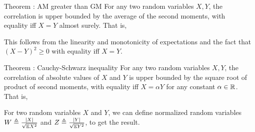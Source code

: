 \documentclass[12pt,aspectratio=169]{beamer}
\begin{document}
\begin{frame}
\begin{block}{Theorem : AM greater than GM} 
For any two random variables $X,Y$, the correlation is upper bounded by the average of the second moments, 
with equality iff $X=Y$ almost surely. 
That is,
\end{block}
\end{frame}
\begin{frame}
\begin{Proof} 
This follows from the linearity and monotonicity of expectations and the fact that $(X-Y)^2 \ge 0$ with equality iff $X = Y$. 
\end{Proof}
\end{frame}
\begin{frame}
\begin{block}{Theorem : Cauchy-Schwarz inequality}  
For any two random variables $X,Y$, the correlation of absolute values of $X$ and $Y$ is upper bounded by the square root of product of second moments, 
with equality iff $X = \alpha Y$ for any constant $\alpha \in \mathbb{R}$. 
That is, 
\end{block}
\end{frame}
\begin{frame}
\begin{Proof} 
For two random variables $X$ and $Y$, we can define normalized random variables $W \triangleq \frac{\left\lvert X\right\rvert}{\sqrt{\mathbb{E} X^2}}$ and $Z \triangleq \frac{\left\lvert Y\right\rvert}{\sqrt{\mathbb{E} Y^2}}$, to get the result.
\end{Proof}
\end{frame}
\end{document}
